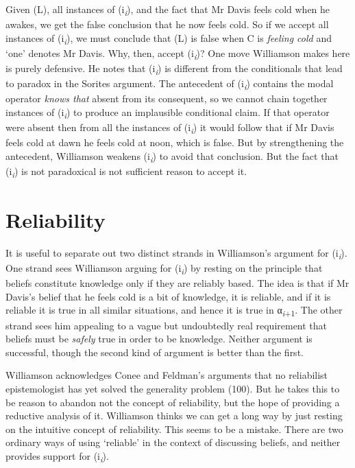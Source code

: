 \documentclass[
  11pt,
  letterpaper,
  DIV=11,
  numbers=noendperiod,
  twoside]{scrartcl}
\renewcommand{\textsc}[1]{{\scfont #1}}
\begin{document}
Given (L), all instances of (\textsc{i}\textsubscript{\emph{i}}), and
the fact that Mr Davis feels cold when he awakes, we get the false
conclusion that he now feels cold. So if we accept all instances of
(\textsc{i}\textsubscript{\emph{i}}), we must conclude that (L) is false
when C is \emph{feeling cold} and `one' denotes Mr Davis. Why, then,
accept (\textsc{i}\textsubscript{\emph{i}})? One move Williamson makes
here is purely defensive. He notes that
(\textsc{i}\textsubscript{\emph{i}}) is different from the conditionals
that lead to paradox in the Sorites argument. The antecedent of
(\textsc{i}\textsubscript{\emph{i}}) contains the modal operator
\emph{knows that} absent from its consequent, so we cannot chain
together instances of (\textsc{i}\textsubscript{\emph{i}}) to produce an
implausible conditional claim. If that operator were absent then from
all the instances of (\textsc{i}\textsubscript{\emph{i}}) it would
follow that if Mr Davis feels cold at dawn he feels cold at noon, which
is false. But by strengthening the antecedent, Williamson weakens
(\textsc{i}\textsubscript{\emph{i}}) to avoid that conclusion. But the
fact that (\textsc{i}\textsubscript{\emph{i}}) is not paradoxical is not
sufficient reason to accept it.

\section{Reliability}\label{reliability}

It is useful to separate out two distinct strands in Williamson's
argument for (\textsc{i}\textsubscript{\emph{i}}). One strand sees
Williamson arguing for (\textsc{i}\textsubscript{\emph{i}}) by resting
on the principle that beliefs constitute knowledge only if they are
reliably based. The idea is that if Mr Davis's belief that he feels cold
is a bit of knowledge, it is reliable, and if it is reliable it is true
in all similar situations, and hence it is true in
α\textsubscript{\emph{i}+1}. The other strand sees him appealing to a
vague but undoubtedly real requirement that beliefs must be
\emph{safely} true in order to be knowledge. Neither argument is
successful, though the second kind of argument is better than the first.

Williamson acknowledges Conee and Feldman's arguments that no
reliabilist epistemologist has yet solved the generality problem (100).
But he takes this to be reason to abandon not the concept of
reliability, but the hope of providing a reductive analysis of it.
Williamson thinks we can get a long way by just resting on the intuitive
concept of reliability. This seems to be a mistake. There are two
ordinary ways of using `reliable' in the context of discussing beliefs,
and neither provides support for (\textsc{i}\textsubscript{\emph{i}}).
\end{document}
